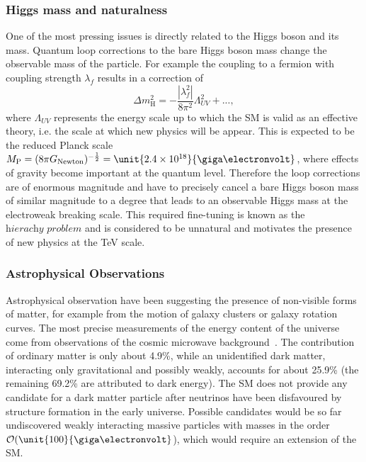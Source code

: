 \subsubsection*{Higgs mass and naturalness}
One of the most pressing issues is directly related to the Higgs boson and its mass. Quantum loop corrections to the bare Higgs boson mass change the observable mass of the particle. For example the coupling to a fermion with coupling strength $\lambda_f$ results in a correction of
\begin{equation}
\Delta m_{\mathrm{H}}^2 = -\frac{|\lambda_f^2|}{8\pi^2}\Lambda_{UV}^2 + ...,
\end{equation}
where $\Lambda_{UV}$ represents the energy scale up to which the SM is valid as an effective theory, i.e. the scale at which new physics will be appear. This is expected to be the reduced Planck scale $M_\mathrm{P} = (8\pi G_{\mathrm{Newton}})^{-\frac{1}{2}} = \unit{2.4\times 10^{18}}{\giga\electronvolt}$, where effects of gravity become important at the quantum level. Therefore the loop corrections are of enormous magnitude and have to precisely cancel a bare Higgs boson mass of similar magnitude to a degree that leads to an observable Higgs mass at the electroweak breaking scale. This required fine-tuning is known as the  $\textit{hierachy problem}$ and is considered to be unnatural and motivates the presence of new physics at the TeV scale.

\subsubsection*{Astrophysical Observations}
Astrophysical observation have been suggesting the presence of non-visible forms of matter, for example from the motion of galaxy clusters or galaxy rotation curves. The most precise measurements of the energy content of the universe come from observations of the cosmic microwave background~\cite{Adam:2015rua}. The contribution of ordinary matter is only about 4.9\%, while an unidentified dark matter, interacting only gravitational and possibly weakly, accounts for about 25.9\% (the remaining 69.2\% are attributed to dark energy). The SM does not provide any candidate for a dark matter particle after neutrinos have been disfavoured by structure formation in the early universe. Possible candidates would be so far undiscovered weakly interacting massive particles with masses in the order $\mathcal{O}(\unit{100}{\giga\electronvolt}$), which would require an extension of the SM. 

